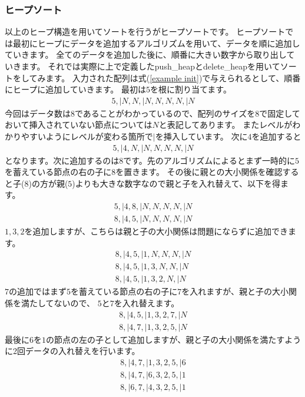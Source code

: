 \documentclass[dvipdfmx,pic,eepic,ecltree]{jarticle}
\begin{document}
\subsubsection{ヒープソート}
以上のヒープ構造を用いてソートを行うがヒープソートです。
ヒープソートでは最初にヒープにデータを追加するアルゴリズムを用いて、データを順に追加していきます。
全てのデータを追加した後に、順番に大きい数字から取り出していきます。
それでは実際に上で定義したpush\_heapとdelete\_heapを用いてソートをしてみます。
入力された配列は式(\ref{example init})で与えられるとして、順番にヒープに追加していきます。
最初は$5$を根に割り当てます。
\begin{eqnarray}
5, |N, N,| N, N, N, N,| N
\end{eqnarray}
今回はデータ数は8であることがわかっているので、配列のサイズを8で固定しておいて挿入されていない節点については$N$と表記してあります。
またレベルがわかりやすいようにレベルが変わる箇所で$|$を挿入しています。
次に$4$を追加すると
\begin{eqnarray}
5, |4, N,| N, N, N, N,| N
\end{eqnarray}
となります。次に追加するのは$8$です。先のアルゴリズムによるとまず一時的に$5$を蓄えている節点の右の子に$8$を置きます。
その後に親との大小関係を確認すると子($8$)の方が親($5$)よりも大きな数字なので親と子を入れ替えて、以下を得ます。
\begin{eqnarray}
5,| 4, 8,| N, N, N, N,| N\\
8,| 4, 5,| N, N, N, N,| N
\end{eqnarray}
$1,3,2$を追加しますが、こちらは親と子の大小関係は問題にならずに追加できます。
\begin{eqnarray}
8,| 4, 5,| 1, N, N, N,| N\\
8,| 4, 5,| 1, 3, N, N,| N\\
8,| 4, 5,| 1, 3, 2, N,| N
\end{eqnarray}
$7$の追加ではまず$5$を蓄えている節点の右の子に$7$を入れますが、親と子の大小関係を満たしてないので、
$5$と$7$を入れ替えます。
\begin{eqnarray}
8,| 4, 5,| 1, 3, 2, 7,| N\\
8,| 4, 7,| 1, 3, 2, 5,| N
\end{eqnarray}
最後に$6$を$1$の節点の左の子として追加しますが、親と子の大小関係を満たすように2回データの入れ替えを行います。
\begin{eqnarray}
8,| 4, 7,| 1, 3, 2, 5,| 6\\
8,| 4, 7,| 6, 3, 2, 5,| 1\\
8,| 6, 7,| 4, 3, 2, 5,| 1
\end{eqnarray}
\end{document}
